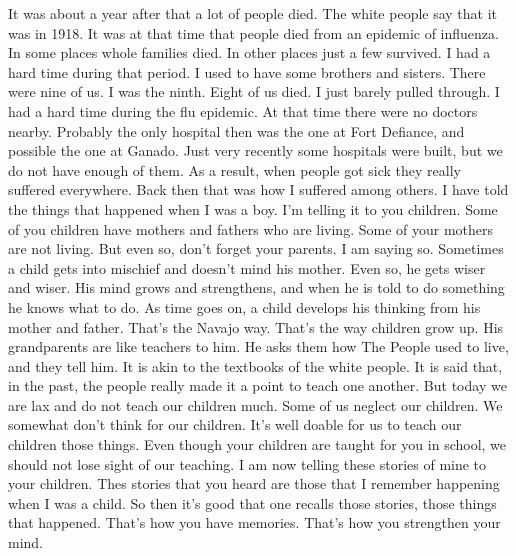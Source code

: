 It was about a year after that a lot of people died. The white people say that it was in 1918. It was at that time that people died from an epidemic of influenza. In some places whole families died. In other places just a few survived. I had a hard time during that period. I used to have some brothers and sisters. There were nine of us. I was the ninth. Eight of us died. I just barely pulled through. I had a hard time during the flu epidemic. At that time there were no doctors nearby. Probably the only hospital then was the one at Fort Defiance, and possible the one at Ganado. Just very recently some hospitals were built, but we do not have enough of them. As a result, when people got sick they really suffered everywhere. Back then that was how I suffered among others. I have told the things that happened when I was a boy. I'm telling it to you children. Some of you children have mothers and fathers who are living. Some of your mothers are not living. But even so, don't forget your parents. I am saying so. Sometimes a child gets into mischief and doesn't mind his mother. Even so, he gets wiser and wiser. His mind grows and strengthens, and when he is told to do something he knows what to do. As time goes on, a child develops his thinking from his mother and father. That's the Navajo way. That's the way children grow up. His grandparents are like teachers to him. He asks them how The People used to live, and they tell him. It is akin to the textbooks of the white people. It is said that, in the past, the people really made it a point to teach one another. But today we are lax and do not teach our children much. Some of us neglect our children. We somewhat don't think for our children. It's well doable for us to teach our children those things. Even though your children are taught for you in school, we should not lose sight of our teaching. I am now telling these stories of mine to your children. Thes stories that you heard are those that I remember happening when I was a child. So then it's good that one recalls those stories, those things that happened. That's how you have memories. That's how you strengthen your mind.